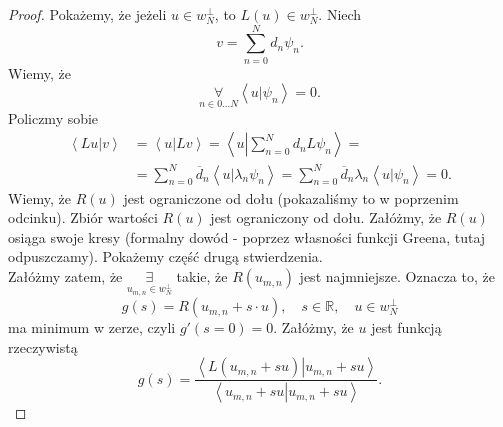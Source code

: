 \documentclass[../main.tex]{subfiles}
\begin{document}
		 \begin{proof}
				 Pokażemy, że jeżeli $u\in w_N^\perp$, to $L(u)\in w_N^\perp$. Niech
				 \[
				 v = \sum_{n=0}^{N} d_n\psi_n
				 .\]
				 Wiemy, że
				 \[
				 \underset{n\in 0\ldots N}{\forall} \left<u|\psi_n \right> = 0
				 .\]
				 Policzmy sobie
				 \begin{align*}
						 \left<Lu|v \right> &= \left<u|Lv \right> = \left<u\left|\sum_{n=0}^{N} d_nL\psi_n \right.\right> = \\
				 &= \sum_{n=0}^{N} \overline{d} _n \left<u|\lambda_n \psi_n \right> = \sum_{n=0}^{N} \overline{d} _n \lambda_n \left<u|\psi_n \right> = 0
				 .\end{align*}
				 Wiemy, że $R(u)$ jest ograniczone od dołu (pokazaliśmy to w poprzenim odcinku). Zbiór wartości $R(u)$ jest ograniczony od dołu. Załóżmy, że $R(u)$ osiąga swoje kresy (formalny dowód - poprzez własności funkcji Greena, tutaj odpuszczamy). Pokażemy część drugą stwierdzenia.\\
				 Załóżmy zatem, że $\underset{u_{m,n}\in w_N^\perp}{\exists} $ takie, że $R(u_{m,n})$ jest najmniejsze. Oznacza to, że
				 \[
						 g(s) = R\left( u_{m,n}+s\cdot u \right) ,\quad s\in \mathbb{R},\quad u\in w_N^\perp
				 \]
				 ma minimum w zerze, czyli $g'(s=0) = 0$.
Załóżmy, że $u$ jest funkcją rzeczywistą
\[
		g(s) = \frac{\left<L(u_{m,n}+su) \left| u_{m,n}+su\right. \right> }{\left<u_{m,n}+su \left| u_{m,n}+su\right. \right> }
.\]


\end{proof}
\end{document}
